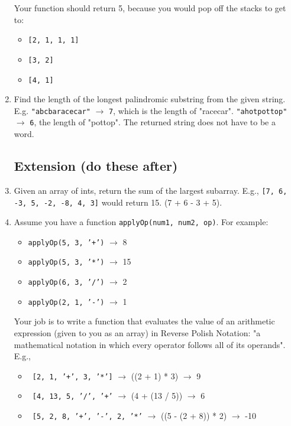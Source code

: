 \documentclass{article}
\begin{document}
\begin{enumerate}
Your function should return 5, because you would pop off the stacks to get to:

\begin{itemize}
  \item \texttt{[2, 1, 1, 1]}
  \item \texttt{[3, 2]}
  \item \texttt{[4, 1]}
\end{itemize}

\item Find the length of the longest palindromic substring from the given string. E.g. \texttt{"abcbaracecar"} $\rightarrow$ \texttt{7}, which is the length of "racecar". \texttt{"ahotpottop"} $\rightarrow$ \texttt{6}, the length of "pottop". The returned string does not have to be a word.

\subsection*{Extension (do these after)}

\item Given an array of ints, return the sum of the largest subarray. E.g., \texttt{[7, 6, -3, 5, -2, -8, 4, 3]} would return 15. (7 + 6 - 3 + 5).

\item Assume you have a function \texttt{applyOp(num1, num2, op)}. For example: %

\begin{itemize}

    \item \texttt{applyOp(5, 3, '+')} $\rightarrow$ 8
    \item \texttt{applyOp(5, 3, '*')} $\rightarrow$ 15
    \item \texttt{applyOp(6, 3, '/')} $\rightarrow$ 2
    \item \texttt{applyOp(2, 1, '-')} $\rightarrow$ 1


\end{itemize}

Your job is to write a function that evaluates the value of an arithmetic expression (given to you as an array) in Reverse Polish Notation: "a mathematical notation in which every operator follows all of its operands". E.g.,

\begin{itemize}

    \item \texttt{ [2, 1, '+', 3, '*']} $\rightarrow$ ((2 + 1) * 3) $\rightarrow$ 9
    \item \texttt{ [4, 13, 5, '/', '+'} $\rightarrow$ (4 + (13 / 5)) $\rightarrow$ 6
    \item \texttt{ [5, 2, 8, '+', '-', 2, '*'} $\rightarrow$ ((5 - (2 + 8)) * 2) $\rightarrow$ -10


\end{itemize}
\end{enumerate}
\end{document}
